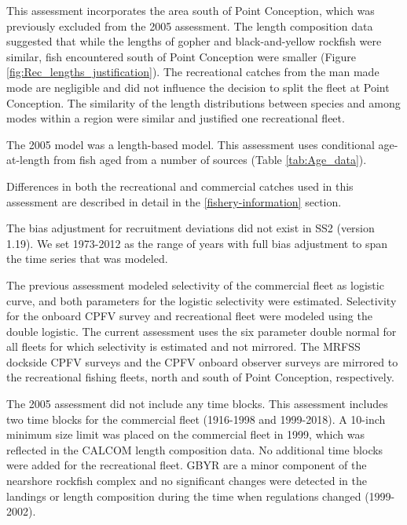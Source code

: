 \documentclass[12pt,]{article}
\begin{document}
This assessment incorporates the area south of Point Conception, which
was previously excluded from the 2005 assessment. The length composition
data suggested that while the lengths of gopher and black-and-yellow
rockfish were similar, fish encountered south of Point Conception were
smaller (Figure \ref{fig:Rec_lengths_justification}). The recreational
catches from the man made mode are negligible and did not influence the
decision to split the fleet at Point Conception. The similarity of the
length distributions between species and among modes within a region
were similar and justified one recreational fleet.

The 2005 model was a length-based model. This assessment uses
conditional age-at-length from fish aged from a number of sources (Table
\ref{tab:Age_data}).

Differences in both the recreational and commercial catches used in this
assessment are described in detail in the \ref{fishery-information}
section.

The bias adjustment for recruitment deviations did not exist in SS2
(version 1.19). We set 1973-2012 as the range of years with full bias
adjustment to span the time series that was modeled.

The previous assessment modeled selectivity of the commercial fleet as
logistic curve, and both parameters for the logistic selectivity were
estimated. Selectivity for the onboard CPFV survey and recreational
fleet were modeled using the double logistic. The current assessment
uses the six parameter double normal for all fleets for which
selectivity is estimated and not mirrored. The MRFSS dockside CPFV
surveys and the CPFV onboard observer surveys are mirrored to the
recreational fishing fleets, north and south of Point Conception,
respectively.

The 2005 assessment did not include any time blocks. This assessment
includes two time blocks for the commercial fleet (1916-1998 and
1999-2018). A 10-inch minimum size limit was placed on the commercial
fleet in 1999, which was reflected in the CALCOM length composition
data. No additional time blocks were added for the recreational fleet.
GBYR are a minor component of the nearshore rockfish complex and no
significant changes were detected in the landings or length composition
during the time when regulations changed (1999-2002).
\end{document}
